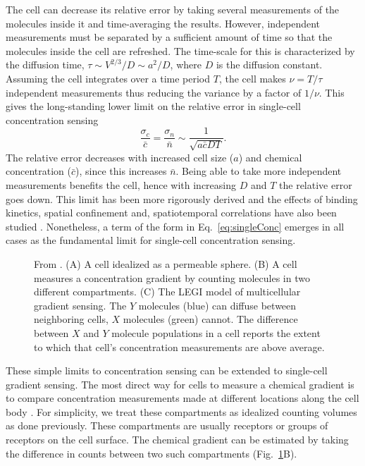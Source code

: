 \documentclass[phys,prelim]{puthesis}
\begin{document}
The cell can decrease its relative error by taking several measurements of the molecules inside it and time-averaging the results. However, independent measurements must be separated by a sufficient amount of time so that the molecules inside the cell are refreshed. The time-scale for this is characterized by the diffusion time, $\tau \sim V^{2/3}/D \sim a^2/D$, where $D$ is the diffusion constant. Assuming the cell integrates over a time period $T$, the cell makes $\nu = T/\tau$ independent measurements thus reducing the variance by a factor of $1/\nu$. This gives the long-standing lower limit on the relative error in single-cell concentration sensing
\begin{equation} \label{eq:singleConc}
\frac{ \sigma_c }{\bar{c}} = \frac{ \sigma_n}{\bar{n}} \sim \frac{1}{\sqrt{a\bar{c}DT}}.
\end{equation}
The relative error decreases with increased cell size ($a$) and chemical concentration ($\bar{c}$), since this increases $\bar{n}$. Being able to take more independent measurements benefits the cell, hence with increasing $D$ and $T$ the relative error goes down. This limit has been more rigorously derived \cite{berg1977physics} and the effects of binding kinetics, spatial confinement and, spatiotemporal correlations have also been studied \cite{bialek2005physical, kaizu2014berg, bicknell2015limits}. Nonetheless, a term of the form in Eq.\ \ref{eq:singleConc} emerges in all cases as the fundamental limit for single-cell concentration sensing.

\begin{figure}[ht]
    \centering
    \caption{From \cite{varennes2015sense}. (A) A cell idealized as a permeable sphere. (B) A cell measures a concentration gradient by counting molecules in two different compartments. (C) The LEGI model of multicellular gradient sensing. The $Y$ molecules (blue) can diffuse between neighboring cells, $X$ molecules (green) cannot. The difference between $X$ and $Y$ molecule populations in a cell reports the extent to which that cell's concentration measurements are above average.} \label{fig:sense0}
\end{figure}

These simple limits to concentration sensing can be extended to single-cell gradient sensing. The most direct way for cells to measure a chemical gradient is to compare concentration measurements made at different locations along the cell body \cite{jilkine2011comparison}. For simplicity, we treat these compartments as idealized counting volumes as done previously. These compartments are usually receptors or groups of receptors on the cell surface. The chemical gradient can be estimated by taking the difference in counts between two such compartments (Fig.\ \ref{fig:sense0}B).
\end{document}
